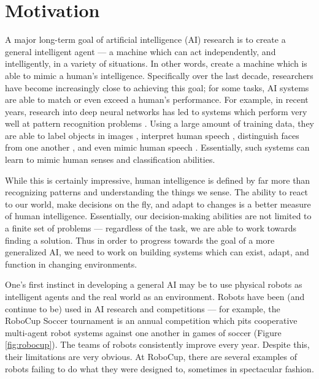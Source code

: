 \section{Motivation} \label{sec:motivation}
A major long-term goal of artificial intelligence (AI) research is to create a general intelligent agent --- a machine which can act independently, and intelligently, in a variety of situations.  In other words, create a machine which is able to mimic a human's intelligence.  Specifically over the last decade, researchers have become increasingly close to achieving this goal; for some tasks, AI systems are able to match or even exceed a human's performance.  For example, in recent years, research into deep neural networks has led to systems which perform very well at pattern recognition problems \cite{imagenet}.  Using a large amount of training data, they are able to label objects in images \cite{imagenet}, interpret human speech \cite{HintonDeng}, distinguish faces from one another \cite{parkhi15}, and even mimic human speech \cite{wavenet}.  Essentially, such systems can learn to mimic human senses and classification abilities.

While this is certainly impressive, human intelligence is defined by far more than recognizing patterns and understanding the things we sense.  The ability to react to our world, make decisions on the fly, and adapt to changes is a better measure of human intelligence.  Essentially, our decision-making abilities are not limited to a finite set of problems --- regardless of the task, we are able to work towards finding a solution.  Thus in order to progress towards the goal of a more generalized AI, we need to work on building systems which can exist, adapt, and function in changing environments.

One's first instinct in developing a general AI may be to use physical robots as intelligent agents and the real world as an environment.  Robots have been (and continue to be) used in AI research and competitions --- for example, the RoboCup Soccer \cite{robocup} tournament is an annual competition which pits cooperative multi-agent robot systems against one another in games of soccer (Figure \ref{fig:robocup}).  The teams of robots consistently improve every year.  Despite this, their limitations are very obvious.  At RoboCup, there are several examples of robots failing to do what they were designed to, sometimes in spectacular fashion.

